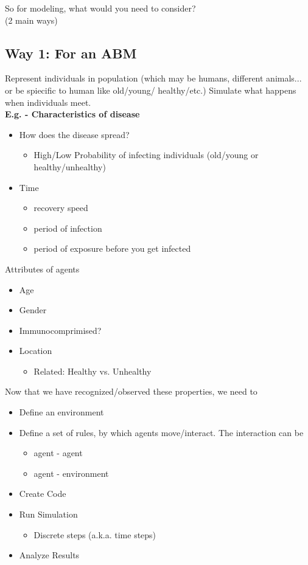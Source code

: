 \documentclass[12pt]{book}
\begin{document}
\noindent So for modeling, what would you need to consider? \\(2 main ways)



\subsection{Way 1: For an ABM}
Represent individuals in population (which may be humans, different animals... or be spiecific to human like old/young/ healthy/etc.)
Simulate what happens when individuals meet.\\


\noindent \textbf{E.g. - Characteristics of disease}
\begin{itemize}
	\item How does the disease spread? 
		\begin{itemize}
		\item High/Low Probability of infecting individuals (old/young or healthy/unhealthy)
		\end{itemize}
	\item Time
		\begin{itemize}
		\item recovery speed
		\item period of infection
		\item period of exposure before you get infected
		\end{itemize}
\end{itemize}



\noindent Attributes of agents
\begin{itemize}
\item Age
\item Gender
\item Immunocomprimised?
\item Location
	\begin{itemize}
	\item Related: Healthy vs. Unhealthy
	\end{itemize}
\end{itemize}

\noindent Now that we have recognized/observed these properties, we need to
\begin{itemize}
\item Define an environment
\item Define a set of rules, by which agents move/interact. The interaction can be 
	\begin{itemize}
	\item agent - agent
	\item agent - environment
	\end{itemize}
\item Create Code
\item Run Simulation
	\begin{itemize}
	\item Discrete steps (a.k.a. time steps)
	\end{itemize}
\item Analyze Results
\end{itemize}
\end{document}
